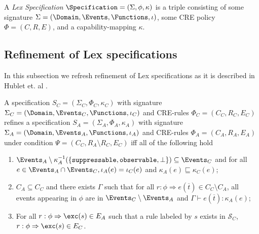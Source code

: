 \begin{definition}
    \label{def:lex-specification}
    A \emph{Lex Specification} 
    $\Specification = \left(\Sigma, \phi, \kappa \right)$
    is a triple consisting of some signature
    $\Sigma = \left(\Domain, \Events, \Functions, \iota \right)$,
    some CRE policy
    $\Phi = \left(C, R, E\right)$,
    and a capability-mapping $\kappa$.
\end{definition}

\subsection{Refinement of Lex specifications}
In this subsection we refresh refinement of Lex specifications as it is described in
Hublet et. al \cite{lex}.

\begin{definition}
    \label{def:lex-refinement}
    A specification
    $S_C = \left( \Sigma_C, \Phi_C, \kappa_C \right)$
    with signature $\Sigma_C = \left( \Domain, \Events_C, \Functions, \iota_C \right)$
    and CRE-rules $\Phi_C = \left(C_C, R_C, E_C \right)$
    refines a specification
    $S_A = \left( \Sigma_A, \Phi_A, \kappa_A \right)$
    with signature $\Sigma_A = \left( \Domain, \Events_A, \Functions, \iota_A \right)$
    and CRE-rules $\Phi_A = \left(C_A, R_A, E_A \right)$
    under condition $\Psi = \left(C_C, R_A \setminus R_C, E_C \right)$
    iff all of the following hold
    \begin{enumerate}
        \item 
        $\Events_A \setminus \kappa_A^{-1} 
        (\lbrace\texttt{suppressable},\texttt{observable},\bot\rbrace)
        \subseteq \Events_C$
        and
        for all
        $e \in \Events_A \cap \Events_C,
        \iota_A(e) = \iota_C(e)$
        and
        $\kappa_A(e) \sqsubseteq \kappa_C(e)$;
        \item
        $C_A \subseteq C_C$ and
        there exists
        $\Gamma$ such that for all $r:\phi \Rightarrow e(\overline{t}) \in C_C \setminus C_A$,
        all events appearing in $\phi$ are in
        $\Events_C \setminus \Events_A$
        and
        $\Gamma \vdash e(\overline{t}) : \kappa_A(e)$;
        \item
        For all $r: \phi \Rightarrow \exc(s) \in E_A$ such that
        a rule labeled by $s$ exists in
        $\mathcal{S}_C$, $r: \phi \Rightarrow \exc(s) \in E_C$.
    \end{enumerate}
    
\end{definition}

